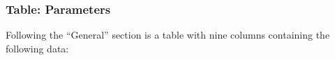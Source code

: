 \documentclass[10pt]{article}
\begin{document}
\subsubsection{Table: Parameters}
%								                                               


Following the ``General'' section is a table with nine columns containing the following data:
\end{document}
